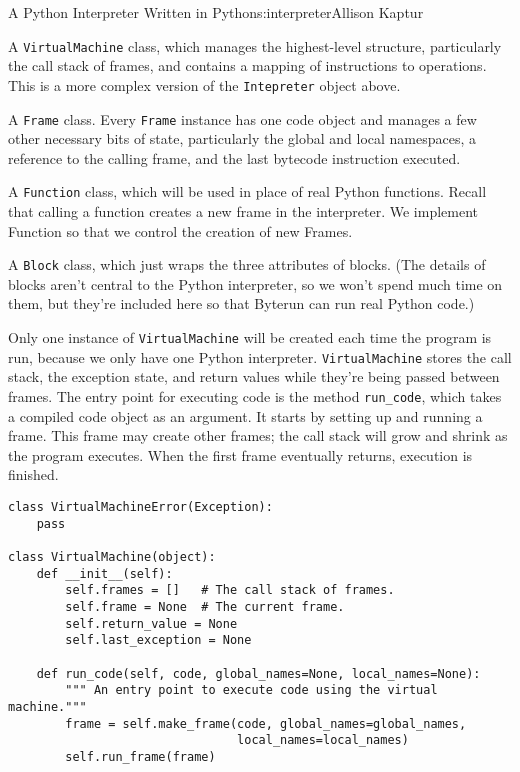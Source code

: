 \begin{aosachapter}{A Python Interpreter Written in Python}{s:interpreter}{Allison Kaptur}
\begin{aosaitemize}
\item
  A \texttt{VirtualMachine} class, which manages the highest-level
  structure, particularly the call stack of frames, and contains a
  mapping of instructions to operations. This is a more complex version
  of the \texttt{Intepreter} object above.
\item
  A \texttt{Frame} class. Every \texttt{Frame} instance has one code
  object and manages a few other necessary bits of state, particularly
  the global and local namespaces, a reference to the calling frame, and
  the last bytecode instruction executed.
\item
  A \texttt{Function} class, which will be used in place of real Python
  functions. Recall that calling a function creates a new frame in the
  interpreter. We implement Function so that we control the creation of
  new Frames.
\item
  A \texttt{Block} class, which just wraps the three attributes of
  blocks. (The details of blocks aren't central to the Python
  interpreter, so we won't spend much time on them, but they're included
  here so that Byterun can run real Python code.)
\end{aosaitemize}

\label{the-virtualmachine-class}

Only one instance of \texttt{VirtualMachine} will be created each time
the program is run, because we only have one Python interpreter.
\texttt{VirtualMachine} stores the call stack, the exception state, and
return values while they're being passed between frames. The entry point
for executing code is the method \texttt{run\_code}, which takes a
compiled code object as an argument. It starts by setting up and running
a frame. This frame may create other frames; the call stack will grow
and shrink as the program executes. When the first frame eventually
returns, execution is finished.

\begin{verbatim}
class VirtualMachineError(Exception):
    pass

class VirtualMachine(object):
    def __init__(self):
        self.frames = []   # The call stack of frames.
        self.frame = None  # The current frame.
        self.return_value = None
        self.last_exception = None

    def run_code(self, code, global_names=None, local_names=None):
        """ An entry point to execute code using the virtual machine."""
        frame = self.make_frame(code, global_names=global_names, 
                                local_names=local_names)
        self.run_frame(frame)
\end{verbatim}


\end{aosachapter}
